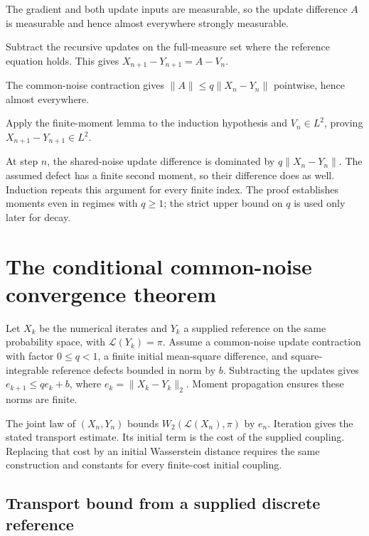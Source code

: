\documentclass[11pt,a4paper]{report}
\begin{document}
The gradient and both update inputs are measurable, so the update difference \(A\) is measurable and hence almost everywhere strongly measurable.



Subtract the recursive updates on the full-measure set where the reference equation holds. This gives \(X_{n+1}-Y_{n+1}=A-V_n\).



The common-noise contraction gives \(\|A\|\le q\|X_n-Y_n\|\) pointwise, hence almost everywhere.



Apply the finite-moment lemma to the induction hypothesis and \(V_n\in L^2\), proving \(X_{n+1}-Y_{n+1}\in L^2\).



At step \(n\), the shared-noise update difference is dominated by \(q\|X_n-Y_n\|\). The assumed defect has a finite second moment, so their difference does as well. Induction repeats this argument for every finite index. The proof establishes moments even in regimes with \(q\ge1\); the strict upper bound on \(q\) is used only later for decay.

\section{\texorpdfstring{The conditional common-noise convergence theorem}{The conditional common-noise convergence theorem}}
\label{proof-module-UnadjustedLangevin-Convergence-lean}


Let \(X_k\) be the numerical iterates and \(Y_k\) a supplied reference on the same probability space, with \(\mathcal L(Y_k)=\pi\). Assume a common-noise update contraction with factor \(0\le q<1\), a finite initial mean-square difference, and square-integrable reference defects bounded in norm by \(b\). Subtracting the updates gives \(e_{k+1}\le qe_k+b\), where \(e_k=\|X_k-Y_k\|_2\). Moment propagation ensures these norms are finite.



The joint law of \((X_n,Y_n)\) bounds \(W_2(\mathcal L(X_n),\pi)\) by \(e_n\). Iteration gives the stated transport estimate. Its initial term is the cost of the supplied coupling. Replacing that cost by an initial Wasserstein distance requires the same construction and constants for every finite-cost initial coupling.

\subsection{\texorpdfstring{Transport bound from a supplied discrete reference}{Transport bound from a supplied discrete reference}}
\label{report-step-UnadjustedLangevin-Convergence-lean-1}
\end{document}
